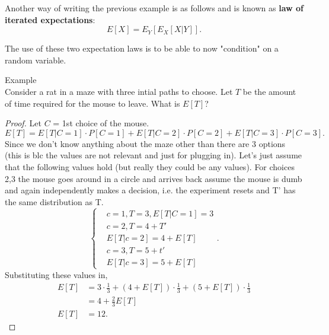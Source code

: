 \documentclass[a4paper]{article}
\begin{document}
 \begin{lemma}
   Another way of writing the previous example is as follows and is known as \textbf{law of iterated expectations}:
   \[
     E[X] = E_Y[E_X[X|Y]]
   .\] 
 \end{lemma}
 \begin{remark}
   The use of these two expectation laws is to be able to now "condition" on a random variable. 
 \end{remark}
 \begin{note}{Example}\\
   Consider a rat in a maze with three intial paths to choose. Let $T$ be the amount of time required for the
   mouse to leave. What is  $E[T]$?

  \begin{proof}
     Let $C$ = 1st choice of the mouse. 
      \[
        E[T] = E[T | C=1] \cdot P[C=1] + E[T|C=2] \cdot P[C=2] + E[T|C=3] \cdot P[C=3] 
      .\]
      Since we don't know anything about the maze other than there are 3 options (this is blc the values
      are not relevant and just for plugging in). Let's just assume that the following values hold (but
      really they could be any values). For choices 2,3 the mouse goes around in a circle and 
      arrives back assume the mouse is dumb and again independently makes a decision, i.e. the experiment 
      resets and T' has the same distribution as T.
      \[
      \begin{cases}
        & c=1, T=3, E[T | C=1] = 3 \\
        & c=2, T=4 + T' \\
        & E[T|c=2] = 4 + E[T] \\
        & c=3, T = 5 + t' \\
        & E[T|c=3] = 5+E[T] 
      \end{cases}
      .\] 
      Substituting these values in,
      \begin{align*}
        E[T] &= 3 \cdot \frac{1}{3} + (4+E[T]) \cdot \frac{1}{3} + (5 + E[T]) \cdot \frac{1}{3} \\
             &= 4 + \frac{2}{3} E[T] \\
        E[T] &= 12
      .\end{align*}
  \end{proof}  
 \end{note}
\end{document}
